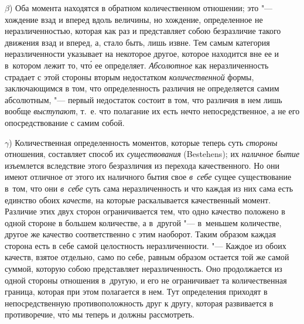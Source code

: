$\beta$) Оба момента находятся в обратном количественном отношении; это "---
хождение взад и вперед вдоль величины, но хождение, определенное не
неразличенностью, которая как раз и представляет собою безразличие такого
движения взад и вперед, а, стало быть, лишь извне. Тем самым категория
неразличенности указывает на некоторое другое, которое находится вне ее и
в~котором лежит то, чт\'{о} ее определяет. {\em Абсолютное} как неразличенность
страдает с этой стороны вторым недостатком {\em количественной} формы,
заключающимся в том, что определенность различия не определяется самим
абсолютным, "--- первый недостаток состоит в том, что различия в нем лишь
вообще {\em выступают}, т.~е. что полагание их есть нечто непосредственное, а
не его опосредствование с самим собой.

$\gamma$) Количественная определенность моментов, которые теперь суть
{\em стороны} отношения, составляет способ их {\em существования} (Bestehens);
их {\em наличное бытие} изъемлется вследствие этого безразличия из перехода
качественного. Но они имеют отличное от этого их наличного бытия свое
{\em в~себе} сущее существование в~том, что они {\em в~себе} суть сама
неразличенность и что каждая из них сама есть единство обоих {\em качеств}, на
которые раскалывается качественный момент. Различие этих двух сторон
ограничивается тем, что одно качество положено в одной стороне в большем
количестве, а в~другой "--- в~меньшем количестве, другое же качество
соответственно с этим наоборот. Таким образом каждая сторона есть в себе самой
целостность неразличенности. "--- Каждое из обоих качеств, взятое отдельно,
само по себе, равным образом остается той же самой суммой, которую собою
представляет неразличенность. Оно продолжается из одной стороны отношения
в~другую, и его не ограничивает та количественная граница, которая при этом
полагается в нем. Тут определения приходят в непосредственную противоположность
друг к другу, которая развивается в противоречие, чт\'{о} мы теперь и должны
рассмотреть.

